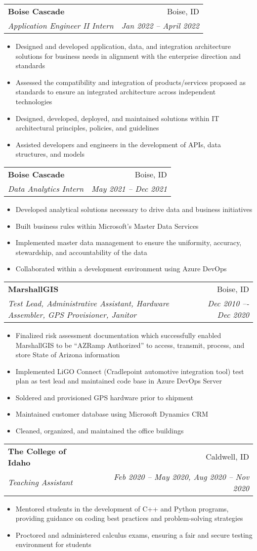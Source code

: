 \documentclass[letterpaper,11pt]{article}
\makeatletter
\newcommand{\resumeItem}[1]{
  \item\small{
    {#1 \vspace{-2pt}}
  }
}
\newcommand{\resumeSubheading}[4]{
  \vspace{-1pt}\item
    \begin{tabular*}{0.97\textwidth}[t]{l@{\extracolsep{\fill}}r}
      \textbf{#1} & #2 \\
      \textit{\small#3} & \textit{\small #4} \\
    \end{tabular*}\vspace{-5pt}
}
\newcommand{\resumeItemListStart}{\begin{itemize}}
\newcommand{\resumeItemListEnd}{\end{itemize}\vspace{-5pt}}
\makeatother
\begin{document}
\resumeSubheading
    {Boise Cascade}{Boise, ID}
    {Application Engineer II Intern}{Jan 2022 -- April 2022}
    \resumeItemListStart
      \resumeItem{}
        {Designed and developed application, data, and integration architecture solutions for business needs in alignment with the enterprise direction and standards}
      \resumeItem{}
        {Assessed the compatibility and integration of products/services proposed as standards to ensure an integrated architecture across independent technologies}
      \resumeItem{}
        {Designed, developed, deployed, and maintained solutions within IT architectural principles, policies, and guidelines}
      \resumeItem{}
        {Assisted developers and engineers in the development of APIs, data structures, and models}
    \resumeItemListEnd

\resumeSubheading
    {Boise Cascade}{Boise, ID}
    {Data Analytics Intern}{May 2021 -- Dec 2021}
    \resumeItemListStart
      \resumeItem{}
        {Developed analytical solutions necessary to drive data and business initiatives}
      \resumeItem{}
        {Built business rules within Microsoft’s Master Data Services}
      \resumeItem{}
        {Implemented master data management to ensure the uniformity, accuracy, stewardship, and accountability of the data}
      \resumeItem{}
        {Collaborated within a development environment using Azure DevOps}
    \resumeItemListEnd

\resumeSubheading
    {MarshallGIS}{Boise, ID}
    {Test Lead, Administrative Assistant, Hardware Assembler, GPS Provisioner, Janitor}{Dec 2010 –- Dec 2020}
    \resumeItemListStart
      \resumeItem{}
        {Finalized risk assessment documentation which successfully enabled MarshallGIS to be “AZRamp Authorized” to access, transmit, process, and store State of Arizona information}
      \resumeItem{}
        {Implemented LiGO Connect (Cradlepoint automotive integration tool) test plan as test lead and maintained code base in Azure DevOps Server}
      \resumeItem{}
        {Soldered and provisioned GPS hardware prior to shipment}
      \resumeItem{}
        {Maintained customer database using Microsoft Dynamics CRM}
      \resumeItem{}
        {Cleaned, organized, and maintained the office buildings}
    \resumeItemListEnd

\resumeSubheading
    {The College of Idaho}{Caldwell, ID}
    {Teaching Assistant}{Feb 2020 -- May 2020, Aug 2020 -- Nov 2020}
    \resumeItemListStart
      \resumeItem{}
        {Mentored students in the development of C++ and Python programs, providing guidance on coding best practices and problem-solving strategies}
      \resumeItem{}
        {Proctored and administered calculus exams, ensuring a fair and secure testing environment for students}
    \resumeItemListEnd
\end{document}
